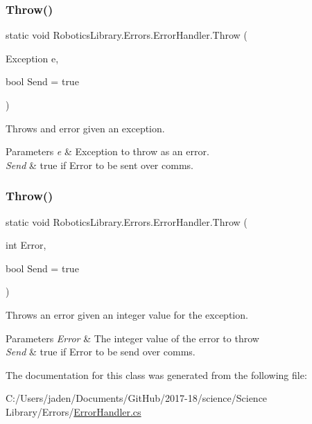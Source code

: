 \subsubsection{\texorpdfstring{Throw()}{Throw()}\hspace{0.1cm}{\footnotesize\ttfamily [1/2]}}
{\footnotesize\ttfamily static void Robotics\+Library.\+Errors.\+Error\+Handler.\+Throw (\begin{DoxyParamCaption}\item[{Exception}]{e,  }\item[{bool}]{Send = {\ttfamily true} }\end{DoxyParamCaption})\hspace{0.3cm}{\ttfamily [static]}}



Throws and error given an exception. 


\begin{DoxyParams}{Parameters}
{\em e} & Exception to throw as an error.\\
\hline
{\em Send} & true if Error to be sent over comms.\\
\hline
\end{DoxyParams}
\mbox{\label{class_robotics_library_1_1_errors_1_1_error_handler_a3d2861114cd4e8cc38cd8c5a8c539a0e}} 
\subsubsection{\texorpdfstring{Throw()}{Throw()}\hspace{0.1cm}{\footnotesize\ttfamily [2/2]}}
{\footnotesize\ttfamily static void Robotics\+Library.\+Errors.\+Error\+Handler.\+Throw (\begin{DoxyParamCaption}\item[{int}]{Error,  }\item[{bool}]{Send = {\ttfamily true} }\end{DoxyParamCaption})\hspace{0.3cm}{\ttfamily [static]}}



Throws an error given an integer value for the exception. 


\begin{DoxyParams}{Parameters}
{\em Error} & The integer value of the error to throw\\
\hline
{\em Send} & true if Error to be send over comms.\\
\hline
\end{DoxyParams}


The documentation for this class was generated from the following file\+:\begin{DoxyCompactItemize}
\item 
C\+:/\+Users/jaden/\+Documents/\+Git\+Hub/2017-\/18/science/\+Science Library/\+Errors/\hyperlink{_error_handler_8cs}{Error\+Handler.\+cs}\end{DoxyCompactItemize}
